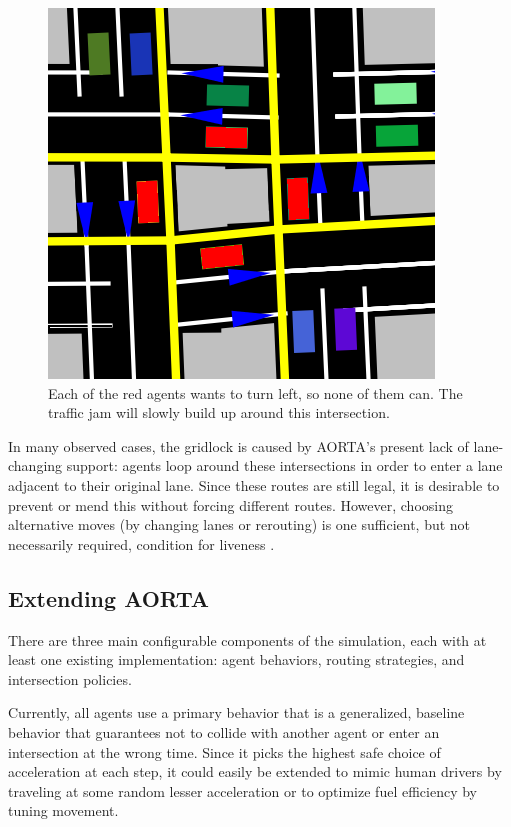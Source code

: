 \documentclass[letterpaper, 10 pt, conference]{ieeeconf}  %
\begin{document}
\begin{figure}[h]
  \centering \includegraphics[scale=0.25]{gridlock.png}
  \caption{Each of the red agents wants to turn left, so none of them
           can. The traffic jam will slowly build up around this intersection.}
  \label{fig:gridlock}
  \vspace{-10pt}
\end{figure}

In many observed cases, the gridlock is caused by AORTA's present lack of
lane-changing support: agents loop around these intersections in order to enter
a lane adjacent to their original lane. Since these routes are still legal, it
is desirable to prevent or mend this without forcing different routes. However,
choosing alternative moves (by changing lanes or rerouting) is one sufficient,
but not necessarily required, condition for liveness \cite{AAAI11-au}.

\subsection{Extending AORTA}
\label{sec:config}

There are three main configurable components of the simulation, each with at
least one existing implementation: agent behaviors, routing strategies, and
intersection policies.

Currently, all agents use a primary behavior that is a generalized, baseline
behavior that guarantees not to collide with another agent or enter an
intersection at the wrong time. Since it picks the highest safe choice of
acceleration at each step, it could easily be extended to mimic human drivers by
traveling at some random lesser acceleration or to optimize fuel efficiency
by tuning movement.
\end{document}
